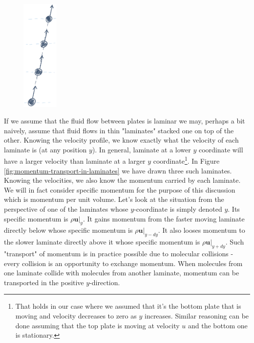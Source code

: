 \documentclass[10pt,twocolumn]{article}
\begin{document}
\begin{figure}
\centering\includegraphics[width=1.8cm]{molecular-collisions.png}
\label{fig:molecular-collisions}
\end{figure}
If we assume that the fluid flow between plates is laminar we may, perhaps a bit naively, assume that fluid flows in thin "laminates" stacked one on top of the other. Knowing the velocity profile, we know exactly what the velocity of each laminate is (at any position $y$). In general, laminate at a lower $y$ coordinate will have a larger velocity than laminate at a larger $y$ coordinate\footnote{That holds in our case where we assumed that it's the bottom plate that is moving and velocity decreases to zero as $y$ increases. Similar reasoning can be done assuming that the top plate is moving at velocity $u$ and the bottom one is stationary.}.
In Figure \ref{fig:momentum-transport-in-laminates} we have drawn three such laminates.
Knowing the velocities, we also know the momentum carried by each laminate. We will in fact consider specific momentum for the purpose of this discussion which is momentum per unit volume. Let's look at the situation from the perspective of one of the laminates whose $y$-coordinate is simply denoted $y$. Its specific momentum is $\rho \mathbf{u}|_{y}$.  It gains momentum from the faster moving laminate directly below whose specific momentum is $\rho \mathbf{u}|_{y-dy}$. It also looses momentum to the slower laminate directly above it whose specific momentum is $\rho \mathbf{u}|_{y+dy}$. Such "transport" of momentum is in practice possible due to molecular collisions - every collision is an opportunity to exchange momentum. When molecules from one laminate collide with molecules from another laminate, momentum can be transported in the positive $y$-direction. 
\end{document}
